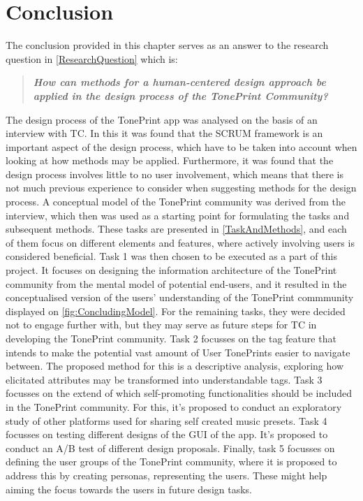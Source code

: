 \chapter{Conclusion}
\label{Conclusion}
%
The conclusion provided in this chapter serves as an answer to the research question in \autoref{ResearchQuestion} which is:
\begin{quote}
	\textbf{\textit{How can methods for a human-centered design approach be applied in the design process of the TonePrint Community?}}
\end{quote}

\noindent
The design process of the TonePrint app was analysed on the basis of an interview with TC. In this it was found that the SCRUM framework is an important aspect of the design process, which have to be taken into account when looking at how methods may be applied. Furthermore, it was found that the design process involves little to no user involvement, which means that there is not much previous experience to consider when suggesting methods for the design process. A conceptual model of the TonePrint community was derived from the interview, which then was used as a starting point for formulating the tasks and subsequent methods. These tasks are presented in \autoref{TaskAndMethods}, and each of them focus on different elements and features, where actively involving users is considered beneficial. Task 1 was then chosen to be executed as a part of this project. It focuses on designing the information architecture of the TonePrint community from the mental model of potential end-users, and it resulted in the conceptualised version of the users' understanding of the TonePrint commmunity displayed on \autoref{fig:ConcludingModel}. For the remaining tasks, they were decided not to engage further with, but they may serve as future steps for TC in developing the TonePrint community. Task 2 focusses on the tag feature that intends to make the potential vast amount of User TonePrints easier to navigate between. The proposed method for this is a descriptive analysis, exploring how elicitated  attributes may be transformed into understandable tags. Task 3 focusses on the extend of which self-promoting functionalities should be included in the TonePrint community. For this, it's proposed to conduct an exploratory study of other platforms used for sharing self created music presets. Task 4 focusses on testing different designs of the GUI of the app. It's proposed to conduct an A/B test of different design proposals. Finally, task 5 focusses on defining the user groups of the TonePrint community, where it is proposed to address this by creating personas, representing the users. These might help aiming the focus towards the users in future design tasks.